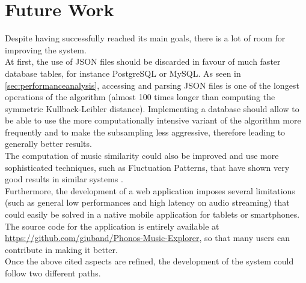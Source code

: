 \chapter{Future Work} 

\label{Chapter8} 


Despite having successfully reached its main goals, there is a lot of room for improving the system. \\
At first, the use of JSON files should be discarded in favour of much faster database tables, for instance PostgreSQL or MySQL. As seen in \ref{sec:performanceanalysis}, accessing and parsing JSON files is one of the longest operations of the algorithm (almost 100 times longer than computing the symmetric Kullback-Leibler distance). Implementing a database should allow to be able to use the more computationally intensive variant of the algorithm more frequently and to make the subsampling less aggressive, therefore leading to generally better results. \\
The computation of music similarity could also be improved and use more sophisticated techniques, such as Fluctuation Patterns, that have shown very good results in similar systems \cite{pohle09}. \\
Furthermore, the development of a web application imposes several limitations (such as general low performances and high latency on audio streaming) that could easily be solved in a native mobile application for tablets or smartphones. \\
The source code for the application is entirely available at \url{https://github.com/giuband/Phonos-Music-Explorer}, so that many users can contribute in making it better.\\
Once the above cited aspects are refined, the development of the system could follow two different paths.

